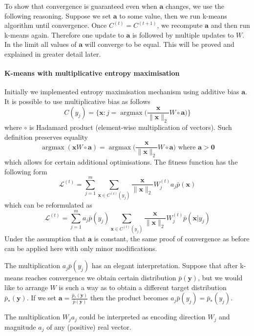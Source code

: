 \documentclass[12pt]{article}
\DeclareMathOperator*{\argmax}{argmax}
\begin{document}
To show that convergence is guaranteed even when $\boldsymbol{a}$ changes, we use the following reasoning. Suppose we set $\boldsymbol{a}$ to some value, then we run k-means algorithm until convergence. Once $C^{(t)}=C^{(t+1)}$, we recompute $\boldsymbol{a}$ and then run k-means again. Therefore one update to $\boldsymbol{a}$ is followed by multiple updates to $W$. In the limit all values of $\boldsymbol{a}$ will converge to be equal. This will be proved and explained in greater detail later.

\paragraph{K-means with multiplicative entropy maximisation}

Initially we implemented entropy maximisation mechanism using additive bias $\boldsymbol{a}$. It is possible to use multiplicative bias as follows
\[
C(y_j) = \{\boldsymbol{x} : j=\argmax\big(\frac{\boldsymbol{x}}{\lVert\boldsymbol{x}\rVert_2}W\circ \boldsymbol{a}\big)\}
\]
where $\circ$ is Hadamard product (element-wise multiplication of vectors).  Such definition preserves equality
\[\argmax(\boldsymbol{x}W\circ \boldsymbol{a})=\argmax\big(\frac{\boldsymbol{x}}{\lVert\boldsymbol{x}\rVert_2}W\circ \boldsymbol{a}\big)\text{ where }\boldsymbol{a}>\boldsymbol{0}\]
which allows for certain additional optimisations. The fitness function has the following form
\[
\mathcal{L}^{(t)} = \sum_{j=1}^m \sum_{\boldsymbol{x}\in C^{(t)}(y_j)}  \frac{\boldsymbol{x}}{\lVert \boldsymbol{x} \rVert_2} W_j^{(t)} a_j \bar{p}(\boldsymbol{x})
\] 
which can be reformulated as
\[
\mathcal{L}^{(t)} = \sum_{j=1}^m a_j \bar{p}(y_j) \sum_{\boldsymbol{x}\in C^{(t)}(y_j)}  \frac{\boldsymbol{x}}{\lVert \boldsymbol{x} \rVert_2} W_j^{(t)} \bar{p}(\boldsymbol{x}|y_j)
\] 
Under the assumption that $\boldsymbol{a}$ is constant, the same proof of convergence as before can be applied here with only minor modifications. 

The multiplication $a_j \bar{p}(y_j)$ has an elegant interpretation. Suppose that after k-means reaches convergence we obtain certain distribution $\bar{p}(\boldsymbol{y})$, but we would like to arrange $W$ is such a way as to obtain a different target distribution $\bar{p}_*(\boldsymbol{y})$. If we set $\boldsymbol{a}=\frac{\bar{p}_*(\boldsymbol{y})}{\bar{p}(\boldsymbol{y})}$ then the product becomes $a_j \bar{p}(y_j) = \bar{p}_*(y_j)$. 

The multiplication $W_ja_j$ could be interpreted as encoding direction $W_j$ and magnitude $a_j$ of any (positive) real vector. 
\end{document}
